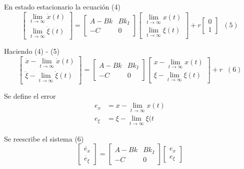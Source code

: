En estado estacionario la ecuación (4)
\[
    \begin{bmatrix}
        \lim_{t \to \infty}\dot{x}(t) \\
        \lim_{t \to \infty}\dot{\xi}(t)
    \end{bmatrix} = 
    \begin{bmatrix}
        A-Bk & Bk_{I} \\
        -C & 0
    \end{bmatrix}
    \begin{bmatrix}
        \lim_{t \to \infty}x(t) \\ 
        \lim_{t \to \infty}\xi(t)
    \end{bmatrix} + r
    \begin{bmatrix}
        0 \\ 1
    \end{bmatrix} \;\; (5)
\]

Haciendo (4) - (5)
\[
    \begin{bmatrix}
        \dot{x} - \lim_{t \to \infty}\dot{x}(t) \\
        \dot{\xi} - \lim_{t \to \infty}\dot{\xi}(t)
    \end{bmatrix} = 
    \begin{bmatrix}
        A-Bk & Bk_{I} \\
        -C & 0
    \end{bmatrix}
    \begin{bmatrix}
        x - \lim_{t \to \infty}x(t) \\ 
        \xi - \lim_{t \to \infty}\xi(t)
    \end{bmatrix} + r \;\; (6)
\]

Se define el error
\[
    \begin{split}
        e_{x} & = x - \lim_{t \to \infty} x(t) \\
        e_{\xi} & = \xi - \lim_{t \to \infty} \xi(t
    \end{split}
\]

Se reescribe el sistema (6)
\[
    \begin{bmatrix}
        \dot{e_{x}} \\
        \dot{e_{\xi}}
    \end{bmatrix} = 
    \begin{bmatrix}
        A-Bk & Bk_{I} \\
        -C & 0
    \end{bmatrix}
    \begin{bmatrix}
        e_{x} \\ 
        e_{\xi}
    \end{bmatrix}
\]

